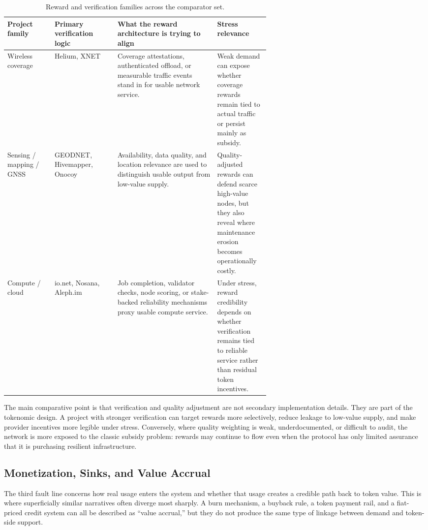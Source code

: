 \begin{table}[H]
    \centering
    \small
    \renewcommand{\arraystretch}{1.25}
    \begin{tabularx}{\textwidth}{@{}>{\raggedright\arraybackslash}p{0.18\linewidth} >{\raggedright\arraybackslash}p{0.24\linewidth} X >{\raggedright\arraybackslash}p{0.20\linewidth}@{}}
        \toprule
        \textbf{Project family} & \textbf{Primary verification logic} & \textbf{What the reward architecture is trying to align} & \textbf{Stress relevance} \\
        \midrule
        Wireless coverage & Helium, XNET & Coverage attestations, authenticated offload, or measurable traffic events stand in for usable network service. & Weak demand can expose whether coverage rewards remain tied to actual traffic or persist mainly as subsidy. \\
        \midrule
        Sensing / mapping / GNSS & GEODNET, Hivemapper, Onocoy & Availability, data quality, and location relevance are used to distinguish usable output from low-value supply. & Quality-adjusted rewards can defend scarce high-value nodes, but they also reveal where maintenance erosion becomes operationally costly. \\
        \midrule
        Compute / cloud & io.net, Nosana, Aleph.im & Job completion, validator checks, node scoring, or stake-backed reliability mechanisms proxy usable compute service. & Under stress, reward credibility depends on whether verification remains tied to reliable service rather than residual token incentives. \\
        \bottomrule
    \end{tabularx}
    \caption[Reward and verification families]{Reward and verification families across the comparator set.}
    \label{tab:v2_reward_verification}
\end{table}

The main comparative point is that verification and quality adjustment are not secondary implementation details. They are part of the tokenomic design. A project with stronger verification can target rewards more selectively, reduce leakage to low-value supply, and make provider incentives more legible under stress. Conversely, where quality weighting is weak, underdocumented, or difficult to audit, the network is more exposed to the classic subsidy problem: rewards may continue to flow even when the protocol has only limited assurance that it is purchasing resilient infrastructure.

\subsection{Monetization, Sinks, and Value Accrual}
The third fault line concerns how real usage enters the system and whether that usage creates a credible path back to token value. This is where superficially similar narratives often diverge most sharply. A burn mechanism, a buyback rule, a token payment rail, and a fiat-priced credit system can all be described as ``value accrual,'' but they do not produce the same type of linkage between demand and token-side support.

